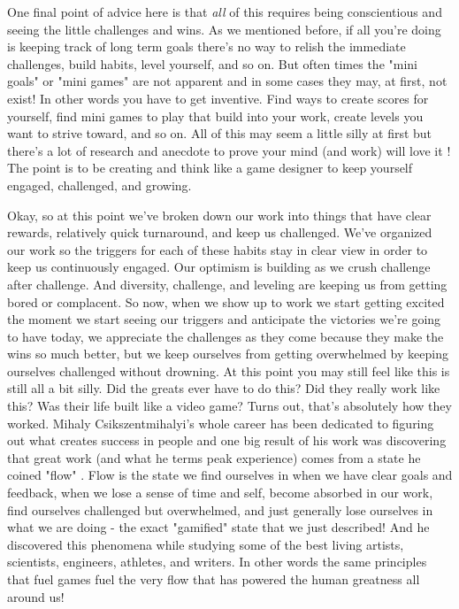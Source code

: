\documentclass[11pt,a5paper]{book}
\begin{document}
One final point of advice here is that \textit{all} of this requires being conscientious and seeing the little challenges and wins. As we mentioned before, if all you're doing is keeping track of long term goals there's no way to relish the immediate challenges, build habits, level yourself, and so on. But often times the "mini goals" or "mini games" are not apparent and in some cases they may, at first, not exist! In other words you have to get inventive. Find ways to create scores for yourself, find mini games to play that build into your work, create levels you want to strive toward, and so on. All of this may seem a little silly at first but there's a lot of research and anecdote to prove your mind (and work) will love it \cite{superbetter}! The point is to be creating and think like a game designer to keep yourself engaged, challenged, and growing. 
\newline

Okay, so at this point we've broken down our work into things that have clear rewards, relatively quick turnaround, and keep us challenged. We've organized our work so the triggers for each of these habits stay in clear view in order to keep us continuously engaged. Our optimism is building as we crush challenge after challenge. And diversity, challenge, and leveling are keeping us from getting bored or complacent. So now, when we show up to work we start getting excited the moment we start seeing our triggers and anticipate the victories we're going to have today, we appreciate the challenges as they come because they make the wins so much better, but we keep ourselves from getting overwhelmed by keeping ourselves challenged without drowning. At this point you may still feel like this is still all a bit silly. Did the greats ever have to do this? Did they really work like this? Was their life built like a video game? Turns out, that's absolutely how they worked. Mihaly Csikszentmihalyi's whole career has been dedicated to figuring out what creates success in people and one big result of his work was discovering that great work (and what he terms peak experience) comes from a state he coined "flow" \cite{flow}. Flow is the state we find ourselves in when we have clear goals and feedback, when we lose a sense of time and self, become absorbed in our work, find ourselves challenged but overwhelmed, and just generally lose ourselves in what we are doing - the exact "gamified" state that we just described! And he discovered this phenomena while studying some of the best living artists, scientists, engineers, athletes, and writers. In other words the same principles that fuel games fuel the very flow that has powered the human greatness all around us!
\newline
\end{document}
